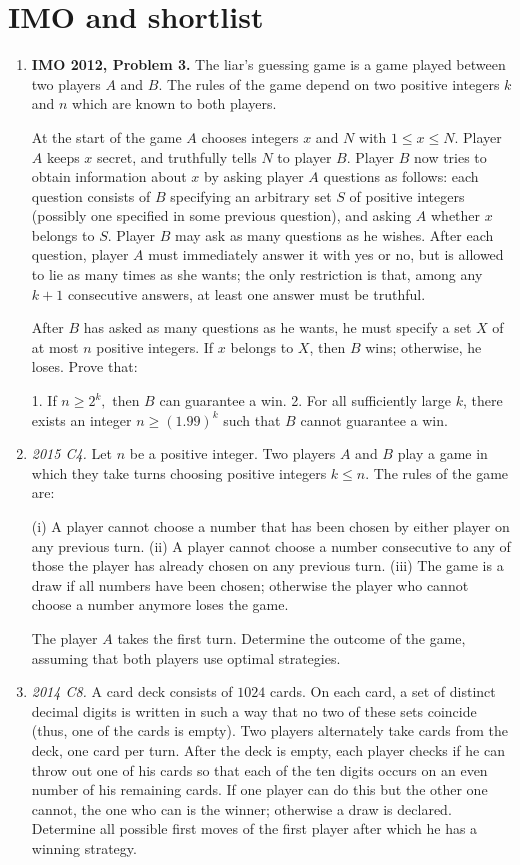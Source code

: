 \documentclass[11pt,a4paper]{article}
\begin{document}
\section {IMO and shortlist}
\begin{enumerate}
\item\textbf {IMO 2012, Problem 3.} The liar's guessing game is a game played between two players $A$ and $B$. The rules of the game depend on two positive integers $k$ and $n$ which are known to both players.

At the start of the game $A$ chooses integers $x$ and $N$ with $1 \le x \le N.$ Player $A$ keeps $x$ secret, and truthfully tells $N$ to player $B$. Player $B$ now tries to obtain information about $x$ by asking player $A$ questions as follows: each question consists of $B$ specifying an arbitrary set $S$ of positive integers (possibly one specified in some previous question), and asking $A$ whether $x$ belongs to $S$. Player $B$ may ask as many questions as he wishes. After each question, player $A$ must immediately answer it with yes or no, but is allowed to lie as many times as she wants; the only restriction is that, among any $k+1$ consecutive answers, at least one answer must be truthful.

After $B$ has asked as many questions as he wants, he must specify a set $X$ of at most $n$ positive integers. If $x$ belongs to $X$, then $B$ wins; otherwise, he loses. Prove that:

1. If $n \ge 2^k,$ then $B$ can guarantee a win.
2. For all sufficiently large $k$, there exists an integer $n \ge (1.99)^k$ such that $B$ cannot guarantee a win.

\item\emph {2015 C4.} Let $n$ be a positive integer. Two players $A$ and $B$ play a game in which they take turns choosing positive integers $k \le n$. The rules of the game are:

(i) A player cannot choose a number that has been chosen by either player on any previous turn.
(ii) A player cannot choose a number consecutive to any of those the player has already chosen on any previous turn.
(iii) The game is a draw if all numbers have been chosen; otherwise the player who cannot choose a number anymore loses the game.

The player $A$ takes the first turn. Determine the outcome of the game, assuming that both players use optimal strategies.

\item\emph {2014 C8.} A card deck consists of $1024$ cards. On each card, a set of distinct decimal digits is
written in such a way that no two of these sets coincide (thus, one of the cards is empty). Two players alternately take cards from the deck, one card per turn. After the deck is empty, each player checks if he can throw out one of his cards so that each of the ten digits occurs on an even number of his remaining cards. If one player can do this but the other one cannot, the one who can is the winner; otherwise a draw is declared.
Determine all possible first moves of the first player after which he has a winning strategy.


\end{enumerate}
\end{document}
